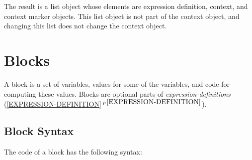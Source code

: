 \documentclass[12pt]{article}
\newcommand{\secref}[1]{\ref{#1}$\,^{p\,\pageref{#1}}$}
\begin{document}
The result is a list object whose elements are expression definition,
context, and context marker objects.  This list object is not
part of the context object, and changing this list does not change
the context object.

\section{Blocks}
\label{BLOCKS}

A block is a set of variables, values for some of the variables, and
code for computing these values.  Blocks are optional parts of
{\em expression-definitions} (\secref{EXPRESSION-DEFINITION}).

\subsection{Block Syntax}
\label{BLOCK-SYNTAX}

The code of a block has the following syntax:
\end{document}
